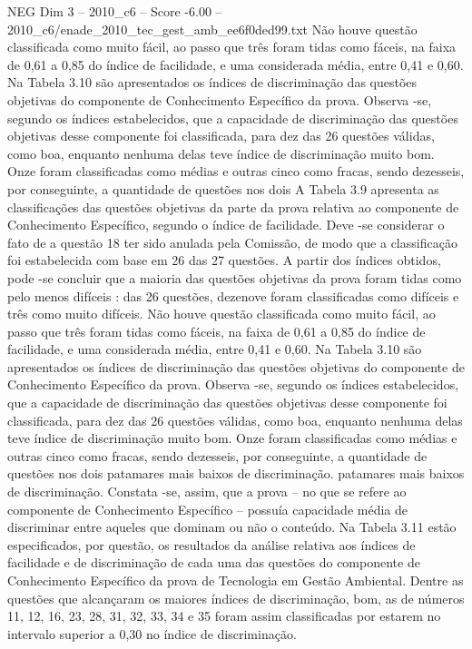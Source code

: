 \begin{textsample}{NEG Dim 3 – 2010\_c6 – Score -6.00 – 2010\_c6/enade\_2010\_tec\_gest\_amb\_ee6f0ded99.txt}
Não houve questão classificada como muito fácil, ao passo que três foram tidas como fáceis, na faixa de 0,61 a 0,85 do índice de facilidade, e uma considerada média, entre 0,41 e 0,60.
Na Tabela 3.10 são apresentados os índices de discriminação das questões objetivas do componente de Conhecimento Específico da prova.
Observa -se, segundo os índices estabelecidos, que a capacidade de discriminação das questões objetivas desse componente foi classificada, para dez das 26 questões válidas, como boa, enquanto nenhuma delas teve índice de discriminação muito bom.
Onze foram classificadas como médias e outras cinco como fracas, sendo dezesseis, por conseguinte, a quantidade de questões nos dois A Tabela 3.9 apresenta as classificações das questões objetivas da parte da prova relativa ao componente de Conhecimento Específico, segundo o índice de facilidade.
Deve -se considerar o fato de a questão 18 ter sido anulada pela Comissão, de modo que a classificação foi estabelecida com base em 26 das 27 questões.
A partir dos índices obtidos, pode -se concluir que a maioria das questões objetivas da prova foram tidas como pelo menos difíceis : das 26 questões, dezenove foram classificadas como difíceis e três como muito difíceis.
Não houve questão classificada como muito fácil, ao passo que três foram tidas como fáceis, na faixa de 0,61 a 0,85 do índice de facilidade, e uma considerada média, entre 0,41 e 0,60.
Na Tabela 3.10 são apresentados os índices de discriminação das questões objetivas do componente de Conhecimento Específico da prova.
Observa -se, segundo os índices estabelecidos, que a capacidade de discriminação das questões objetivas desse componente foi classificada, para dez das 26 questões válidas, como boa, enquanto nenhuma delas teve índice de discriminação muito bom.
Onze foram classificadas como médias e outras cinco como fracas, sendo dezesseis, por conseguinte, a quantidade de questões nos dois patamares mais baixos de discriminação. patamares mais baixos de discriminação.
Constata -se, assim, que a prova – no que se refere ao componente de Conhecimento Específico – possuía capacidade média de discriminar entre aqueles que dominam ou não o conteúdo.
Na Tabela 3.11 estão especificados, por questão, os resultados da análise relativa aos índices de facilidade e de discriminação de cada uma das questões do componente de Conhecimento Específico da prova de Tecnologia em Gestão Ambiental.
Dentre as questões que alcançaram os maiores índices de discriminação, bom, as de números 11, 12, 16, 23, 28, 31, 32, 33, 34 e 35 foram assim classificadas por estarem no intervalo superior a 0,30 no índice de discriminação.

\end{textsample}
